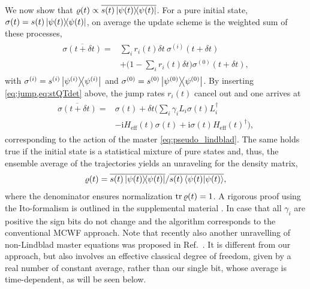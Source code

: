 \documentclass[twocolumn,prl,superscriptaddress]{revtex4-2}
\renewcommand{\i}{\mathrm i}
\begin{document}
We now show that $\varrho(t) \propto \overline{s(t) \dyad{\psi(t)}}$. For a pure initial state, $\sigma(t) = s(t) \dyad{\psi(t)}$, on average the update scheme is the weighted sum of these processes,
\begin{align}
	\begin{aligned}
		\overline{ \sigma (t+  \delta t)} =& \sum_i r_i(t) \delta t\  \sigma^{(i)}(t +\delta t) \\ &+ \bigg(1-\sum_i r_i(t) \delta t\bigg)  \sigma^{(0)}(t +\delta t),
	\end{aligned}
\end{align}
with $\sigma^{(i)} = s^{(i)} \dyad{\psi^{(i)}}$ and $\sigma^{(0)} = s^{(0)} \dyad{\psi^{(0)}}$. By inserting \cref{eq:jump,eq:stQTdet} above, the jump rates $r_i(t)$ cancel out and one arrives at 
\begin{align}
	\begin{split}
		\overline{ \sigma (t+  \delta t)} =& \sigma(t) + \delta t \bigg( \sum_i \gamma_i L_i \sigma(t) L_i^\dagger \\ & - \i H_\mathrm{eff}(t) \sigma(t) + \i \sigma(t) H_\mathrm{eff}(t)^\dagger \bigg),
	\end{split}
\end{align}
corresponding to the action of the master \cref{eq:pseudo_lindblad}. The same holds true if the initial state is a statistical mixture of pure states and, thus, the ensemble average of the trajectories yields an unraveling for the density matrix, 
\begin{align}
	\varrho(t) = {\overline{s(t) \dyad{\psi(t)}}}/{\overline{s(t) \braket{\psi(t)}}},
\end{align}
where the denominator ensures normalization $\tr \varrho(t) = 1$. A rigorous proof using the Ito-formalism is outlined in the supplemental material \cite{supp_TBeckerCNetzerAEckardt2023}. In case that all $\gamma_i$ are positive the sign bits do not change and the algorithm corresponds to the conventional MCWF approach. Note that recently also another unravelling of non-Lindblad master equations was proposed in Ref.~\cite{DonvilMGinanneschi2022}. It is different from our approach, but also involves an effective classical degree of freedom, given by a real number of constant average, rather than our single bit, whose average is time-dependent, as will be seen below. 
\end{document}

